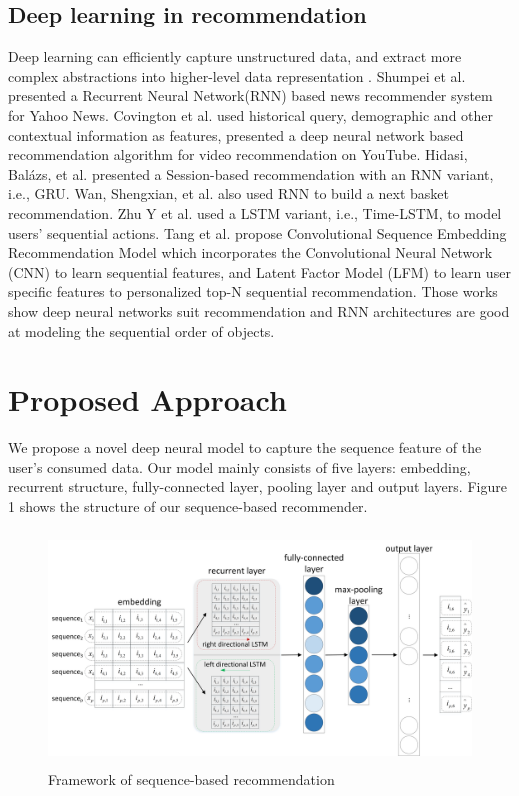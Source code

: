 \documentclass[runningheads]{llncs}
\begin{document}
\subsection{Deep learning in recommendation}
Deep learning can efficiently capture unstructured data, and extract more complex abstractions into higher-level data representation \cite{Zhang2017DeepLB}.  Shumpei et al. \cite{okura2017embedding} presented a Recurrent Neural Network(RNN) based news recommender system for Yahoo News. Covington et al. \cite{covington2016deep} used historical query, demographic and other contextual information as features, presented a deep neural network based recommendation algorithm for video recommendation on YouTube. Hidasi, Balázs, et al. \cite{DBLP:journals/corr/HidasiKBT15} presented a Session-based recommendation with an RNN variant, i.e., GRU. Wan, Shengxian, et al. \cite{Wan2015NextBR} also used RNN to build a next basket recommendation. Zhu Y et al. \cite{ijcai2017-504} used a LSTM variant, i.e., Time-LSTM, to model users’ sequential actions. Tang et al. \cite{Tang:2018:PTS:3159652.3159656} propose Convolutional Sequence Embedding Recommendation Model which incorporates the Convolutional Neural Network (CNN) to learn sequential features, and Latent Factor Model (LFM) to learn user specific features to personalized top-N sequential recommendation. Those works show deep neural networks suit recommendation and RNN architectures are good at modeling the sequential order of objects.

\section{Proposed Approach}

We propose a novel deep neural model to capture the sequence feature of the user's consumed data. Our model mainly consists of five layers: embedding, recurrent structure, fully-connected layer, pooling layer and output layers. Figure 1 shows the structure of our sequence-based recommender.
\begin{figure}[htbp]
\centerline
{\includegraphics[height=6.2cm,width=\linewidth]{image/structer.png}}
\caption{Framework of sequence-based recommendation }
\end{figure}
\end{document}
